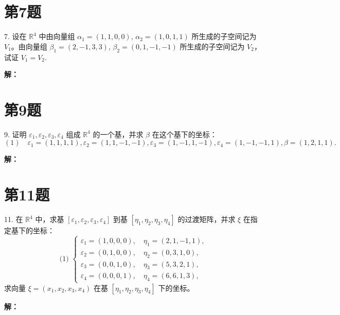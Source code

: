 \documentclass[a4paper, 12pt]{ctexart}
\begin{document}
\section*{第7题}
\begin{exercise}
7. 设在 $\mathbb{R}^4$ 中由向量组 $\alpha_1 = (1,1,0,0)$, $\alpha_2 = (1,0,1,1)$ 所生成的子空间记为 $V_1$。由向量组 $\beta_1 = (2,-1,3,3)$, $\beta_2 = (0,1,-1,-1)$ 所生成的子空间记为 $V_2$，试证 $V_1 = V_2$.


\end{exercise}
\noindent\textbf{解：}














\section*{第9题}
\begin{exercise}
9. 证明 $\varepsilon_1, \varepsilon_2, \varepsilon_3, \varepsilon_4$ 组成 $\mathbb{R}^4$ 的一个基，并求 $\beta$ 在这个基下的坐标： \\
$(1) \quad  \varepsilon_1 = (1,1,1,1), \varepsilon_2 = (1,1,-1,-1), \varepsilon_3 = (1,-1,1,-1), \varepsilon_4 = (1,-1,-1,1), \beta = (1,2,1,1).$

\end{exercise}
\noindent\textbf{解：}














\section*{第11题}
\begin{exercise}
11. 在 $\mathbb{R}^4$ 中，求基 $[\varepsilon_1, \varepsilon_2, \varepsilon_3, \varepsilon_4]$ 到基 $[\eta_1, \eta_2, \eta_3, \eta_4]$ 的过渡矩阵，并求 $\xi$ 在指定基下的坐标： \\
\[
\text{(1) } 
\left\{
\begin{array}{l}
\varepsilon_1 = (1,0,0,0), \quad \eta_1 = (2,1,-1,1), \\
\varepsilon_2 = (0,1,0,0), \quad \eta_2 = (0,3,1,0), \\
\varepsilon_3 = (0,0,1,0), \quad \eta_3 = (5,3,2,1), \\
\varepsilon_4 = (0,0,0,1), \quad \eta_4 = (6,6,1,3),
\end{array}
\right.
\]
求向量 $\xi = (x_1, x_2, x_3, x_4)$ 在基 $[\eta_1, \eta_2, \eta_3, \eta_4]$ 下的坐标。

\end{exercise}
\noindent\textbf{解：}
\
\end{document}
